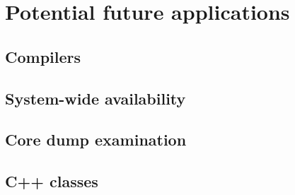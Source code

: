 \chapter{Potential future applications}

\section{Compilers}
\section{System-wide availability}
\section{Core dump examination}
\section{C++ classes}

